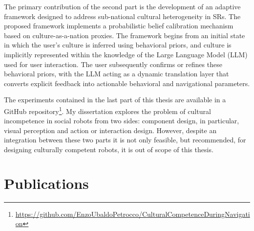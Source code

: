 The primary contribution of the second part is the development of an adaptive framework designed to address sub-national cultural heterogeneity in SRs. 
The proposed framework implements a probabilistic belief calibration mechanism based on culture-as-a-nation proxies. 
The framework begins from an initial state in which the user's culture is inferred using behavioral priors, and culture is implicitly represented within the knowledge of the Large Language Model (LLM) used for user interaction. 
The user subsequently confirms or refines these behavioral priors, with the LLM acting as a dynamic translation layer that converts explicit feedback into actionable behavioral and navigational parameters.

The experiments contained in the last part of this thesis are available in a GitHub repository\footnote{\url{https://github.com/EnzoUbaldoPetrocco/CulturalCompetenceDuringNavigation}\label{ch1:url:ccn}}.
My dissertation explores the problem of cultural incompetence in social robots from two sides: component design, in particular, visual perception and action or interaction design.
However, despite an integration between these two parts it is not only feasible, but recommended, for designing culturally competent robots, it is out of scope of this thesis.
\section{Publications}

